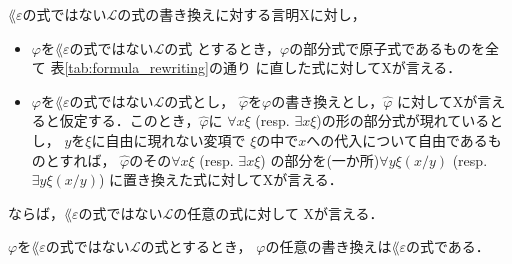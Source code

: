 	\begin{screen}
		\begin{metaaxm}[式の書き換えに関する構造的帰納法の原理]
			$\lang{\varepsilon}$の式ではない$\mathcal{L}$の式の書き換えに対する言明Xに対し，
			\begin{itemize}
				\item $\varphi$を$\lang{\varepsilon}$の式ではない$\mathcal{L}$の式
					とするとき，$\varphi$の部分式で原子式であるものを全て
					表\ref{tab:formula_rewriting}の通り
					に直した式に対してXが言える．
					
				\item $\varphi$を$\lang{\varepsilon}$の式ではない$\mathcal{L}$の式とし，
					$\widehat{\varphi}$を$\varphi$の書き換えとし，$\widehat{\varphi}$
					に対してXが言えると仮定する．このとき，$\widehat{\varphi}$に
					$\forall x \xi$ (resp. $\exists x \xi$)の形の部分式が現れているとし，
					$y$を$\xi$に自由に現れない変項で
					$\xi$の中で$x$への代入について自由であるものとすれば，
					$\widehat{\varphi}$のその$\forall x \xi$ (resp. $\exists x \xi$)
					の部分を(一か所)$\forall y \xi(x/y)$ (resp. $\exists y \xi(x/y)$)
					に置き換えた式に対してXが言える．
			\end{itemize}
			ならば，$\lang{\varepsilon}$の式ではない$\mathcal{L}$の任意の式に対して
			Xが言える．
		\end{metaaxm}
	\end{screen}
	
	\begin{screen}
		\begin{metathm}
		\label{metathm:rewritten_formulas_are_of_L_epsilon}
			$\varphi$を$\lang{\varepsilon}$の式ではない$\mathcal{L}$の式とするとき，
			$\varphi$の任意の書き換えは$\lang{\varepsilon}$の式である．
		\end{metathm}
	\end{screen}
	
